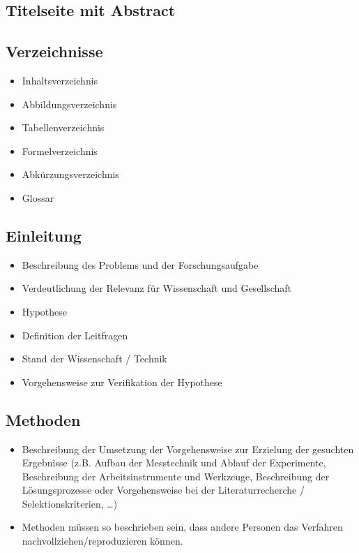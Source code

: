 \subsection*{Titelseite mit Abstract}
\subsection*{Verzeichnisse}

\begin{itemize}
	\item Inhaltsverzeichnis
	\item Abbildungsverzeichnis
	\item Tabellenverzeichnis
	\item Formelverzeichnis
	\item Abkürzungsverzeichnis
	\item Glossar
\end{itemize}

\subsection*{Einleitung}

\begin{itemize}
	\item Beschreibung des Problems und der Forschungsaufgabe
	\item Verdeutlichung der Relevanz für Wissenschaft und Gesellschaft
	\item Hypothese
	\item Definition der Leitfragen
	\item Stand der Wissenschaft / Technik
	\item Vorgehensweise zur Verifikation der Hypothese
\end{itemize}

\subsection*{Methoden}

\begin{itemize}
	\item Beschreibung der Umsetzung der Vorgehensweise zur Erzielung der gesuchten Ergebnisse (z.B. Aufbau der Messtechnik und Ablauf der Experimente, Beschreibung der Arbeitsinstrumente und Werkzeuge, Beschreibung der Lösungsprozesse oder Vorgehensweise bei der Literaturrecherche / Selektionskriterien, …)
	\item Methoden müssen so beschrieben sein, dass andere Personen das Verfahren nachvollziehen/reproduzieren können.
\end{itemize}

